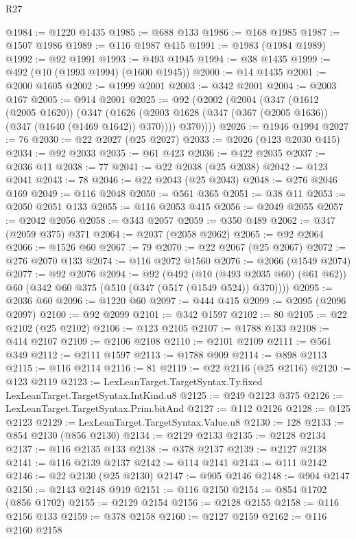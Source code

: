 \begin{lexlean}{R27}
\begin{coremodule}
@1984 := @1220 @1435
@1985 := @688 @133
@1986 := @168 @1985
@1987 := @1507 @1986
@1989 := @116 @1987 @415
@1991 := @1983 (@1984 @1989)
@1992 := @92 @1991
@1993 := @493 @1945
@1994 := @38 @1435
@1999 := @492 (@10 (@1993 @1994) (@1600 @1945))
@2000 := @14 @1435
@2001 := @2000 @1605
@2002 := @1999 @2001
@2003 := @342 @2001
@2004 := @2003 @167
@2005 := @914 @2001
@2025 := @92
    (@2002
      (@2004
        (@347
          (@1612 (@2005 @1620))
          (@347
            (@1626 (@2003 @1628 (@347 (@367 (@2005 @1636)) (@347 (@1640 (@1469 @1642)) @370))))
            @370))))
@2026 := @1946 @1994
@2027 := 76
@2030 := @22 @2027 (@25 @2027)
@2033 := @2026 (@123 @2030 @415)
@2034 := @92 @2033
@2035 := @61 @423
@2036 := @422 @2035
@2037 := @2036 @11
@2038 := 77
@2041 := @22 @2038 (@25 @2038)
@2042 := @123 @2041
@2043 := 78
@2046 := @22 @2043 (@25 @2043)
@2048 := @276 @2046 @169
@2049 := @116 @2048
@2050 := @561 @365
@2051 := @38 @11
@2053 := @2050 @2051 @133
@2055 := @116 @2053 @415
@2056 := @2049 @2055
@2057 := @2042 @2056
@2058 := @343 @2057
@2059 := @350 @489
@2062 := @347 (@2059 @375) @371
@2064 := @2037 (@2058 @2062)
@2065 := @92 @2064
@2066 := @1526 @60
@2067 := 79
@2070 := @22 @2067 (@25 @2067)
@2072 := @276 @2070 @133
@2074 := @116 @2072 @1560
@2076 := @2066 (@1549 @2074)
@2077 := @92 @2076
@2094 := @92
    (@492
      (@10 (@493 @2035 @60) (@61 @62))
      @60
      (@342 @60 @375 (@510 (@347 (@517 (@1549 @524)) @370))))
@2095 := @2036 @60
@2096 := @1220 @60
@2097 := @444 @415
@2099 := @2095 (@2096 @2097)
@2100 := @92 @2099
@2101 := @342 @1597
@2102 := 80
@2105 := @22 @2102 (@25 @2102)
@2106 := @123 @2105
@2107 := @1788 @133
@2108 := @414 @2107
@2109 := @2106 @2108
@2110 := @2101 @2109
@2111 := @561 @349
@2112 := @2111 @1597
@2113 := @1788 @909
@2114 := @898 @2113
@2115 := @116 @2114
@2116 := 81
@2119 := @22 @2116 (@25 @2116)
@2120 := @123 @2119
@2123 := LexLeanTarget.TargetSyntax.Ty.fixed LexLeanTarget.TargetSyntax.IntKind.u8
@2125 := @249 @2123 @375
@2126 := LexLeanTarget.TargetSyntax.Prim.bitAnd
@2127 := @112 @2126
@2128 := @125 @2123
@2129 := LexLeanTarget.TargetSyntax.Value.u8
@2130 := 128
@2133 := @854 @2130 (@856 @2130)
@2134 := @2129 @2133
@2135 := @2128 @2134
@2137 := @116 @2135 @133
@2138 := @378 @2137
@2139 := @2127 @2138
@2141 := @116 @2139 @2137
@2142 := @114 @2141
@2143 := @111 @2142
@2146 := @22 @2130 (@25 @2130)
@2147 := @905 @2146
@2148 := @904 @2147
@2150 := @2143 @2148 @919
@2151 := @116 @2150
@2154 := @854 @1702 (@856 @1702)
@2155 := @2129 @2154
@2156 := @2128 @2155
@2158 := @116 @2156 @133
@2159 := @378 @2158
@2160 := @2127 @2159
@2162 := @116 @2160 @2158

\end{coremodule}
\end{lexlean}
